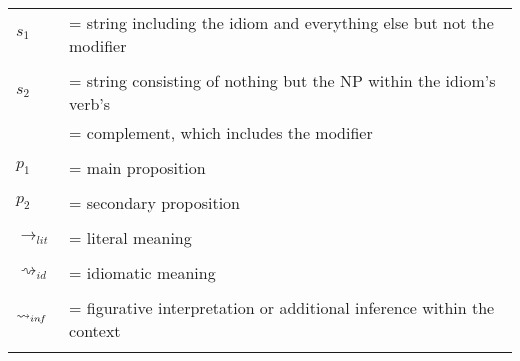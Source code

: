 \documentclass[output=paper]{langsci/langscibook}
\begin{document}
  \begin{tabular}{ll}

$s_{1}$\hspace{-5pt}								&	= \hspace{1pt} string including the idiom and everything else but not the modifier \\
\vspace{-10pt} \\
$s_{2}$\hspace{-5pt}								&	= \hspace{1pt} string consisting of nothing but the NP within the idiom's verb's \\
											&	{\white =} \hspace{1pt} complement, which includes the modifier \\
\vspace{-10pt} \\
$p_{1}$\hspace{-5pt}								&	= \hspace{1pt} main proposition \\
\vspace{-10pt} \\
$p_{2}$\hspace{-5pt}								&	= \hspace{1pt} secondary proposition \\
\vspace{-10pt} \\
$\rightarrow_{lit}$\hspace{-5pt}						&	= \hspace{1pt} literal meaning \\
\vspace{-10pt} \\
$\rightsquigarrow_{id}$\hspace{-5pt}					&	= \hspace{1pt} idiomatic meaning \\
\vspace{-10pt} \\
$\rightsquigarrow_{in\hspace{-0.8pt} f}$\hspace{-5pt}	&	= \hspace{1pt} figurative interpretation or additional inference within the context \\
\vspace{-10pt} \\
\end{tabular}
\vspace{10pt}
\end{document}
